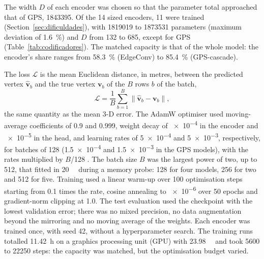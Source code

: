The width $D$ of each encoder was chosen \citep{dwivedi2023benchmarking} so that the parameter total approached that of GPS, \num{1843395}. Of the \num{14} sized encoders, \num{11} were trained (Section~\ref{sec:dificuldades}), with \num{1819019} to \num{1873531} parameters (maximum deviation of \qty{1.6}{\percent}) and $D$ from \num{132} to \num{685}, except for GPS (Table~\ref{tab:codificadores}). The matched capacity is that of the whole model: the encoder's share ranges from \qty{58.3}{\percent} (EdgeConv) to \qty{85.4}{\percent} (GPS-cascade).

The loss $\mathcal{L}$ is the mean Euclidean distance, in metres, between the predicted vertex $\hat{\mathbf{v}}_b$ and the true vertex $\mathbf{v}_b$ of the $B$ rows $b$ of the batch,
\begin{equation}
  \mathcal{L} = \frac{1}{B} \sum_{b=1}^{B} \big\lVert \hat{\mathbf{v}}_b - \mathbf{v}_b \big\rVert,
  \label{eq:perda}
\end{equation}
the same quantity as the mean 3-D error. The AdamW optimiser \citep{loshchilov2019decoupled} used moving-average coefficients of \num{0.9} and \num{0.999}, weight decay of \num{e-4} in the encoder and \num{e-5} in the head, and learning rates of \num{5e-4} and \num{5e-3}, respectively, for batches of \num{128} (\num{1.5e-4} and \num{1.5e-3} in the GPS models), with the rates multiplied by $B$/\num{128} \citep{goyal2017accurate}. The batch size $B$ was the largest power of two, up to \num{512}, that fitted in \qty{20}{\gibi\byte} during a memory probe: \num{128} for four models, \num{256} for two and \num{512} for five. Training used a linear warm-up over \num{100} optimisation steps starting from \num{0.1} times the rate, cosine annealing to \num{e-6} over \num{50} epochs \citep{loshchilov2017sgdr} and gradient-norm clipping at \num{1.0}. The test evaluation used the checkpoint with the lowest validation error; there was no mixed precision, no data augmentation beyond the mirroring and no moving average of the weights. Each encoder was trained once, with seed \num{42}, without a hyperparameter search. The training runs totalled \qty{11.42}{\hour} on a graphics processing unit (GPU) with \qty{23.98}{\gibi\byte} and took \num{5600} to \num{22250} steps: the capacity was matched, but the optimisation budget varied.
